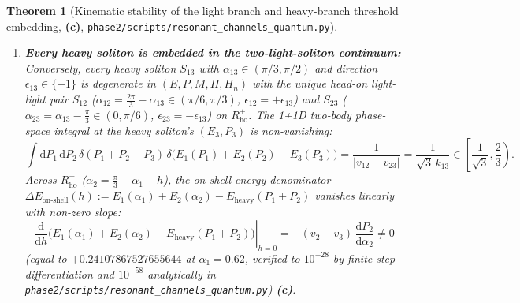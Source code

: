 \documentclass[11pt,a4paper]{article}
\newcommand{\Lc}{\textsf{\textbf{(c)}}\xspace}
\newcommand{\dd}{\mathrm{d}}
\newcommand{\squant}{\texttt{phase2/\allowbreak scripts/\allowbreak resonant\_\allowbreak channels\_\allowbreak quantum.py}}
\newtheorem{theorem}[proposition]{Theorem}
\theoremstyle{remark}
\begin{document}
\begin{theorem}[Kinematic stability of the light branch and heavy-branch threshold embedding, \Lc, \squant]
\begin{enumerate}
\item \textbf{Every heavy soliton is embedded in the two-light-soliton continuum:}
Conversely, every heavy soliton $S_{13}$ with $\alpha_{13}\in(\pi/3,\pi/2)$ and
direction $\epsilon_{13}\in\{\pm 1\}$ is degenerate in $(E,P,M,\Pi,H_n)$ with the
unique head-on light-light pair $S_{12}$ ($\alpha_{12}=\frac{2\pi}{3}-\alpha_{13}\in(\pi/6,\pi/3)$,
$\epsilon_{12}=+\epsilon_{13}$) and $S_{23}$ ($\alpha_{23}=\alpha_{13}-\frac{\pi}{3}\in(0,\pi/6)$,
$\epsilon_{23}=-\epsilon_{13}$) on $R_{\mathrm{ho}}^+$. The 1+1D two-body
phase-space integral at the heavy soliton's $(E_3,P_3)$ is non-vanishing:
\begin{equation}\label{eq:phase_space_1to2}
  \int \dd P_1\,\dd P_2\,\delta(P_1+P_2-P_3)\,\delta\big(E_1(P_1)+E_2(P_2)-E_3(P_3)\big)
  = \frac{1}{|v_{12} - v_{23}|} = \frac{1}{\sqrt{3}\,k_{13}} \in \left[\frac{1}{\sqrt{3}},\frac{2}{3}\right).
\end{equation}
Across $R_{\mathrm{ho}}^+$ ($\alpha_2 = \frac{\pi}{3}-\alpha_1-h$), the on-shell
energy denominator $\Delta E_{\mathrm{on\text{-}shell}}(h) := E_1(\alpha_1)+E_2(\alpha_2)-E_{\mathrm{heavy}}(P_1+P_2)$
vanishes linearly with non-zero slope:
\begin{equation}\label{eq:onshell_slope}
  \left.\frac{\dd}{\dd h}\Big(E_1(\alpha_1) + E_2(\alpha_2) - E_{\mathrm{heavy}}(P_1+P_2)\Big)\right|_{h=0}
  = -(v_2 - v_3)\,\frac{\dd P_2}{\dd\alpha_2} \ne 0
\end{equation}
(equal to $+0.24107867527655644$ at $\alpha_1=0.62$, verified to $10^{-28}$ by
finite-step differentiation and $10^{-58}$ analytically in \squant) \Lc.
\end{enumerate}
\end{theorem}
\end{document}
